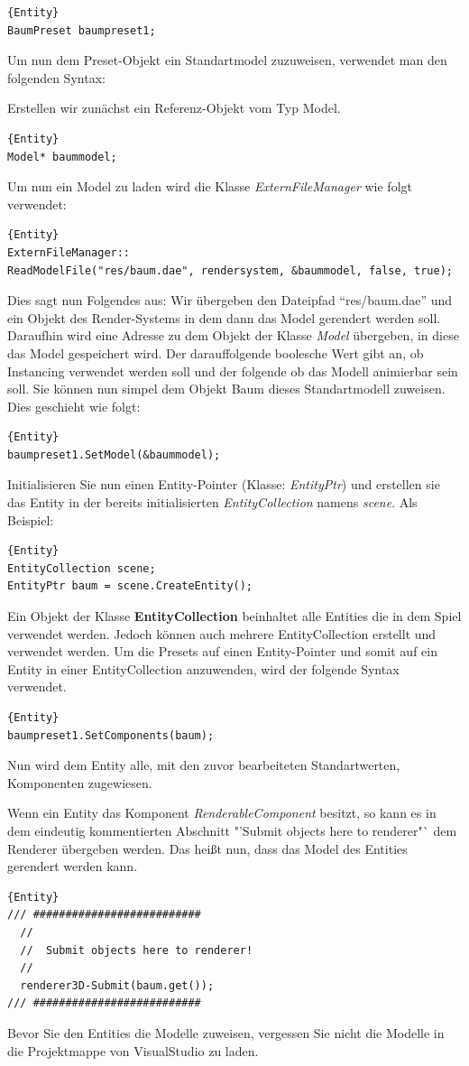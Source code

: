 \begin{lstlisting}{Entity}
BaumPreset baumpreset1;
\end{lstlisting}
Um nun dem Preset-Objekt ein Standartmodel zuzuweisen, verwendet man den folgenden Syntax:

Erstellen wir zunächst ein Referenz-Objekt vom Typ Model.
\begin{lstlisting}{Entity}
Model* baummodel;
\end{lstlisting}
Um nun ein Model zu laden wird die Klasse \textit{ExternFileManager} wie folgt verwendet:
\begin{lstlisting}{Entity}
ExternFileManager::
ReadModelFile("res/baum.dae", rendersystem, &baummodel, false, true);
\end{lstlisting}
Dies sagt nun Folgendes aus:
Wir übergeben den Dateipfad "`res/baum.dae"' und ein Objekt des Render-Systems in dem dann das Model gerendert werden soll. Daraufhin wird  eine Adresse zu dem Objekt der Klasse \textit{Model} übergeben, in diese das Model gespeichert wird. Der darauffolgende boolesche Wert gibt an, ob Instancing verwendet werden soll und der folgende ob das Modell animierbar sein soll. Sie können nun simpel dem Objekt Baum dieses Standartmodell zuweisen. Dies geschieht wie folgt:
\begin{lstlisting}{Entity}
baumpreset1.SetModel(&baummodel);
\end{lstlisting}
Initialisieren Sie nun einen Entity-Pointer (Klasse: \textit{EntityPtr}) und erstellen sie das Entity in der bereits initialisierten \textit{EntityCollection} namens \textit{scene}. Als Beispiel:
\begin{lstlisting}{Entity}
EntityCollection scene;
EntityPtr baum = scene.CreateEntity();
\end{lstlisting}
Ein Objekt der Klasse \textbf{EntityCollection} beinhaltet alle Entities die in dem Spiel verwendet werden. Jedoch können auch mehrere EntityCollection erstellt und verwendet werden.
Um die Presets auf einen Entity-Pointer und somit auf ein Entity in einer EntityCollection anzuwenden, wird der folgende Syntax verwendet. 
\begin{lstlisting}{Entity}
baumpreset1.SetComponents(baum);
\end{lstlisting}
Nun wird dem Entity alle, mit den zuvor bearbeiteten Standartwerten, Komponenten zugewiesen.

Wenn ein Entity das Komponent \textit{RenderableComponent} besitzt, so kann es in dem eindeutig kommentierten Abschnitt "'Submit objects here to renderer"` dem Renderer übergeben werden. Das heißt nun, dass das Model des Entities gerendert werden kann.
\begin{lstlisting}{Entity}
/// ##########################
  //
  //  Submit objects here to renderer!
  //
  renderer3D-Submit(baum.get());
/// ##########################
\end{lstlisting}
Bevor Sie den Entities die Modelle zuweisen, vergessen Sie nicht die Modelle in die Projektmappe von VisualStudio zu laden.

